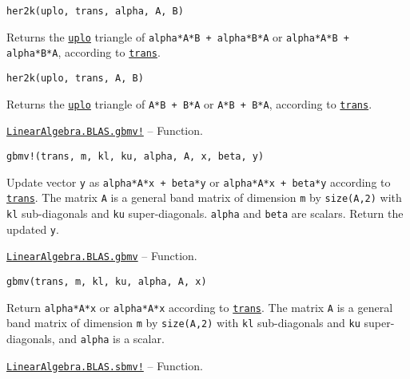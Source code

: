 \begin{adjustwidth}{2em}{0pt}


\begin{verbatim}
her2k(uplo, trans, alpha, A, B)
\end{verbatim}

Returns the \hyperlink{13880289478825450693}{\texttt{uplo}} triangle of \texttt{alpha*A*B{\textquotesingle} + alpha*B*A{\textquotesingle}} or \texttt{alpha*A{\textquotesingle}*B + alpha*B{\textquotesingle}*A}, according to \hyperlink{15951037910221396131}{\texttt{trans}}.




\begin{lstlisting}
her2k(uplo, trans, A, B)
\end{lstlisting}

Returns the \hyperlink{13880289478825450693}{\texttt{uplo}} triangle of \texttt{A*B{\textquotesingle} + B*A{\textquotesingle}} or \texttt{A{\textquotesingle}*B + B{\textquotesingle}*A}, according to \hyperlink{15951037910221396131}{\texttt{trans}}.



\end{adjustwidth}
\hypertarget{8676615954581837341}{} 
\hyperlink{8676615954581837341}{\texttt{LinearAlgebra.BLAS.gbmv!}}  -- {Function.}

\begin{adjustwidth}{2em}{0pt}


\begin{verbatim}
gbmv!(trans, m, kl, ku, alpha, A, x, beta, y)
\end{verbatim}

Update vector \texttt{y} as \texttt{alpha*A*x + beta*y} or \texttt{alpha*A{\textquotesingle}*x + beta*y} according to \hyperlink{15951037910221396131}{\texttt{trans}}. The matrix \texttt{A} is a general band matrix of dimension \texttt{m} by \texttt{size(A,2)} with \texttt{kl} sub-diagonals and \texttt{ku} super-diagonals. \texttt{alpha} and \texttt{beta} are scalars. Return the updated \texttt{y}.



\end{adjustwidth}
\hypertarget{12471388286549789624}{} 
\hyperlink{12471388286549789624}{\texttt{LinearAlgebra.BLAS.gbmv}}  -- {Function.}

\begin{adjustwidth}{2em}{0pt}


\begin{verbatim}
gbmv(trans, m, kl, ku, alpha, A, x)
\end{verbatim}

Return \texttt{alpha*A*x} or \texttt{alpha*A{\textquotesingle}*x} according to \hyperlink{15951037910221396131}{\texttt{trans}}. The matrix \texttt{A} is a general band matrix of dimension \texttt{m} by \texttt{size(A,2)} with \texttt{kl} sub-diagonals and \texttt{ku} super-diagonals, and \texttt{alpha} is a scalar.



\end{adjustwidth}
\hypertarget{321677349067447286}{} 
\hyperlink{321677349067447286}{\texttt{LinearAlgebra.BLAS.sbmv!}}  -- {Function.}

